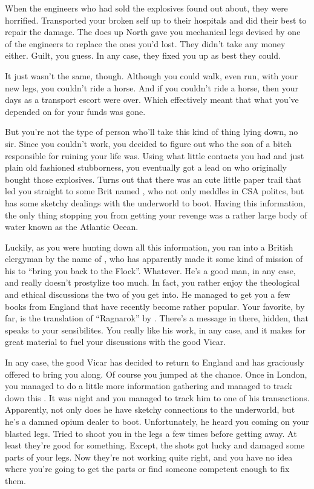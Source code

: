 \documentclass[char]{airship}
\begin{document}
When the engineers who had sold the explosives found out about, they
were horrified.  Transported your broken self up to their hospitals
and did their best to repair the damage.  The docs up North gave you
mechanical legs devised by one of the engineers to replace the ones
you'd lost.  They didn't take any money either.  Guilt, you guess.  In
any case, they fixed you up as best they could.

It just wasn't the same, though.  Although you could walk, even run,
with your new legs, you couldn't ride a horse.  And if you couldn't
ride a horse, then your days as a transport escort were over.  Which
effectively meant that what you've depended on for your funds was
gone.

But you're not the type of person who'll take this kind of thing lying
down, no sir.  Since you couldn't work, you decided to figure out who
the son of a bitch responsible for ruining your life was.  Using what
little contacts you had and just plain old fashioned stubborness, you
eventually got a lead on who originally bought those explosives.
Turns out that there was an cute little paper trail that led you
straight to some Brit named \cDealer{\intro}, who not only meddles in CSA
politcs, but has some sketchy dealings with the underworld to boot.
Having this information, the only thing stopping you from getting your
revenge was a rather large body of water known as the Atlantic Ocean.

Luckily, as you were hunting down all this information, you ran into a
British clergyman by the name of \cVicar{\intro}, who has apparently made
it some kind of mission of his to ``bring you back to the Flock''.
Whatever.  He's a good man, in any case, and really doesn't prostylize
too much.  In fact, you rather enjoy the theological and ethical
discussions the two of you get into.  He managed to get you a few
books from England that have recently become rather popular.  Your
favorite, by far, is the translation of ``Ragnarok'' by
\cSaboteur{\intro}.  There's a message in there, hidden, that speaks to
your sensibilites.  You really like his work, in any case, and it
makes for great material to fuel your discussions with the good Vicar.

In any case, the good Vicar has decided to return to England and has
graciously offered to bring you along.  Of course you jumped at the
chance.  Once in London, you managed to do a little more information
gathering and managed to track down this {\cDealer{}}.  It was night
and you managed to track him to one of his transactions.  Apparently,
not only does he have sketchy connections to the underworld, but he's
a damned opium dealer to boot.  Unfortunately, he heard you coming on
your blasted legs.  Tried to shoot you in the legs a few times before
getting away.  At least they're good for something.  Except, the shots
got lucky and damaged some parts of your legs.  Now they're not
working quite right, and you have no idea where you're going to get
the parts or find someone competent enough to fix them.
\end{document}
